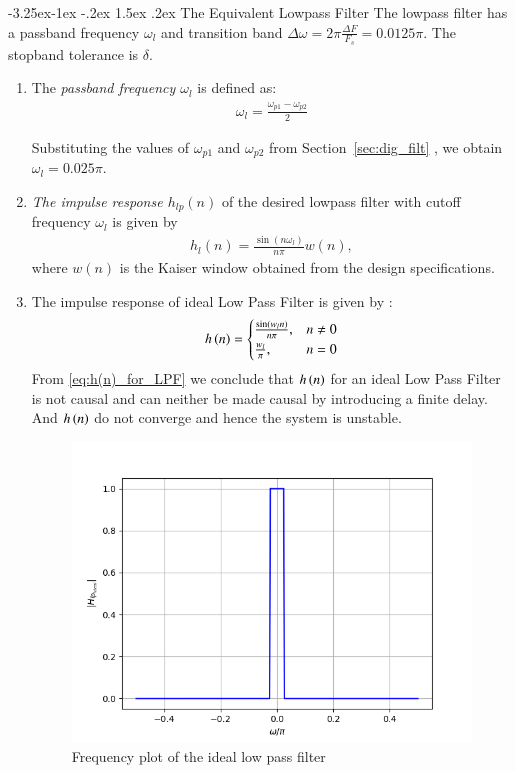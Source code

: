 \documentclass[article]{IEEEtran}
\makeatletter
\theoremstyle{remark}
\newcommand{\secref}[1]{Section~\ref{#1}}
\numberwithin{equation}{subsection}
\renewcommand\subsection{\@startsection{subsection}{2}{\z@}%
    {-3.25ex\@plus -1ex \@minus -.2ex}%
    {1.5ex \@plus .2ex}%
    {\normalfont\large\bfseries}}
\makeatother
\begin{document}
\subsection{The Equivalent Lowpass Filter}
The lowpass filter has a passband frequency $\omega_l$ and transition band $\Delta \omega = 2\pi \frac{\Delta F}{F_s} = 0.0125\pi$.
The stopband tolerance is $\delta$.
\begin{enumerate}
\item  The {\em passband frequency $\omega_l$}  is defined as:
\begin{align}
    \omega_l = \frac{\omega_{p1} - \omega_{p2}}{2}
\end{align}

 Substituting the values of $\omega_{p1}$ and $\omega_{p2}$ from \secref{sec:dig_filt} , we obtain $\omega_l = 0.025\pi$.

\item {\em The impulse response $h_{lp}(n)$} of the desired lowpass filter with cutoff frequency $\omega_l$
is given by
\begin{eqnarray}
\label{firlpdef}
h_l(n) = \frac{\sin(n\omega_l)}{n\pi}w(n),
\end{eqnarray}
where $w(n)$ is the Kaiser window obtained from the design specifications.

\item The impulse response of ideal Low Pass Filter is given by :
\begin{align}
    h\left(n\right) = 
\begin{cases} 
    \frac{\sin(w_l n)}{n\pi}, &  n \neq 0 \\
    \frac{w_l}{\pi}, &  n = 0
\end{cases} \label{eq:h(n)_for_LPF}
\end{align}
From \eqref{eq:h(n)_for_LPF} we conclude that $h\left(n\right)$ for an ideal Low Pass Filter is not causal and can neither be made causal by introducing a finite delay. And $h\left(n\right)$ do not converge and hence the system is unstable.
\begin{figure}[!ht]
    \centering
    \includegraphics[width = \columnwidth]{figs/ideal frequency response plot.png}
    \caption{Frequency plot of the ideal low pass filter}
    \label{fig:ideal lpfilter}
\end{figure}


\end{enumerate}
\end{document}
